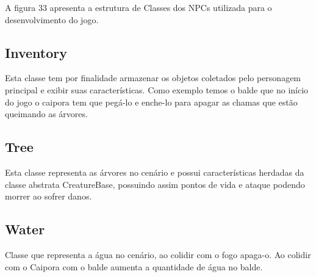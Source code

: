 A figura 33 apresenta a estrutura de Classes dos NPCs utilizada para o desenvolvimento do jogo.

	\begin{figure}[h!]
		\centering
	\end{figure}

\subsection{Inventory}
Esta classe tem por finalidade armazenar os objetos coletados pelo personagem principal e exibir suas características. Como exemplo temos o balde que no início do jogo o caipora tem que pegá-lo e enche-lo para apagar as chamas que estão queimando as árvores.


\subsection{Tree}
Esta classe representa as árvores no cenário e possui características herdadas da classe abstrata CreatureBase, possuindo assim pontos de vida e ataque podendo  morrer ao sofrer danos.


\subsection{Water}
Classe que representa a água no cenário, ao colidir com o fogo apaga-o. Ao colidir com o Caipora com o balde aumenta a quantidade de água no balde.


